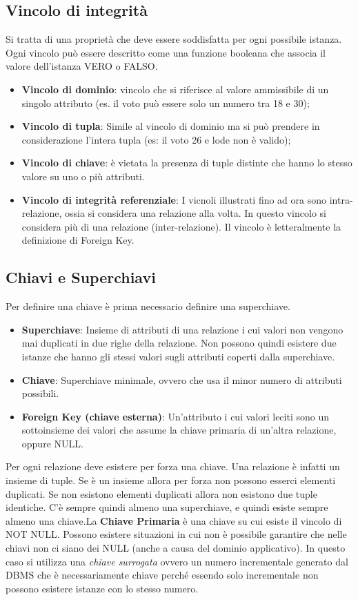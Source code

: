 \subsection{Vincolo di integrità}
Si tratta di una proprietà che deve essere soddisfatta per ogni possibile istanza. Ogni vincolo può essere descritto come una funzione booleana che associa il valore dell'istanza VERO o FALSO.
\begin{itemize}
	\item \textbf{Vincolo di dominio}: vincolo che si riferisce al valore ammissibile di un singolo attributo (es. il voto può essere solo un numero tra 18 e 30);
	\item \textbf{Vincolo di tupla}: Simile al vincolo di dominio ma si può prendere in considerazione l'intera tupla (es: il voto 26 e lode non è valido);
	\item \textbf{Vincolo di chiave}: è vietata la presenza di tuple distinte che hanno lo stesso valore su uno o più attributi.
	\item \textbf{Vincolo di integrità referenziale}: I vicnoli illustrati fino ad ora sono intra-relazione, ossia si considera una relazione alla volta. In questo vincolo si considera più di una relazione (inter-relazione). Il vincolo è letteralmente la definizione di Foreign Key.
\end{itemize}

\subsection{Chiavi e Superchiavi}
Per definire una chiave è prima necessario definire una superchiave.
\begin{itemize}
	\item \textbf{Superchiave}: Insieme di attributi di una relazione i cui valori non vengono mai duplicati in due righe della relazione. Non possono quindi esistere due istanze che hanno gli stessi valori sugli attributi coperti dalla superchiave.
	\item \textbf{Chiave}: Superchiave minimale, ovvero che usa il minor numero di attributi possibili.
	\item \textbf{Foreign Key (chiave esterna)}: Un'attributo i cui valori leciti sono un sottoinsieme dei valori che assume la chiave primaria di un'altra relazione, oppure NULL.
\end{itemize}
Per ogni relazione deve esistere per forza una chiave. Una relazione è infatti un insieme di tuple. Se è un insieme allora per forza non possono esserci elementi duplicati. Se non esistono elementi duplicati allora non esistono due tuple identiche. C'è sempre quindi almeno una superchiave, e quindi esiste sempre almeno una chiave.\newline La \textbf{Chiave Primaria} è una chiave su cui esiste il vincolo di NOT NULL.\newline
Possono esistere situazioni in cui non è possibile garantire che nelle chiavi non ci siano dei NULL (anche a causa del dominio applicativo). In questo caso si utilizza una \textit{chiave surrogata} ovvero un numero incrementale generato dal DBMS che è necessariamente chiave perché essendo solo incrementale non possono esistere istanze con lo stesso numero.

